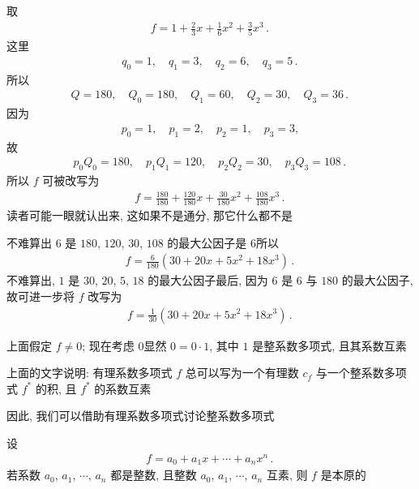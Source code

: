 \begin{example}
    取
    \begin{align*}
        f = 1 + \frac{2}{3} x + \frac{1}{6}x^2 + \frac{3}{5}x^3 \period
    \end{align*}
    这里
    \begin{align*}
        q_0 = 1, \quad q_1 = 3, \quad q_2 = 6, \quad q_3 = 5 \period
    \end{align*}
    所以
    \begin{align*}
        Q = 180, \quad Q_0 = 180, \quad Q_1 = 60, \quad Q_2 = 30, \quad Q_3 = 36 \period
    \end{align*}
    因为
    \begin{align*}
        p_0 = 1, \quad p_1 = 2, \quad p_2 = 1, \quad p_3 = 3,
    \end{align*}
    故
    \begin{align*}
        p_0 Q_0 = 180, \quad p_1 Q_1 = 120, \quad p_2 Q_2 = 30, \quad p_3 Q_3 = 108 \period
    \end{align*}
    所以 $f$ 可被改写为
    \begin{align*}
        f = \frac{180}{180} + \frac{120}{180} x + \frac{30}{180} x^2 + \frac{108}{180} x^3 \period
    \end{align*}
    读者可能一眼就认出来, 这如果不是通分, 那它什么都不是\period

    不难算出 $6$ 是 $180$, $120$, $30$, $108$ 的最大公因子是 $6$\period 所以
    \begin{align*}
        f = \frac{6}{180} (30 + 20x + 5x^2 + 18x^3) \period
    \end{align*}
    不难算出, $1$ 是 $30$, $20$, $5$, $18$ 的最大公因子\period 最后, 因为 $6$ 是 $6$ 与 $180$ 的最大公因子, 故可进一步将 $f$ 改写为
    \begin{align*}
        f = \frac{1}{30} (30 + 20x + 5x^2 + 18x^3) \period
    \end{align*}
\end{example}

上面假定 $f \neq 0$; 现在考虑 $0$\period 显然 $0 = 0 \cdot 1$, 其中 $1$ 是整系数多项式, 且其系数互素\period

上面的文字说明: 有理系数多项式 $f$ 总可以写为一个有理数 $c_f$ 与一个整系数多项式 $f^{\ast}$ 的积, 且 $f^{\ast}$ 的系数互素\period

因此, 我们可以借助有理系数多项式讨论整系数多项式\period

\begin{definition}
    设
    \begin{align*}
        f = a_0 + a_1 x + \cdots + a_n x^n \period
    \end{align*}
    若系数 $a_0$, $a_1$, $\cdots$, $a_n$ 都是整数, 且整数 $a_0$, $a_1$, $\cdots$, $a_n$ 互素, 则 $f$ 是本原的 \period
\end{definition}

